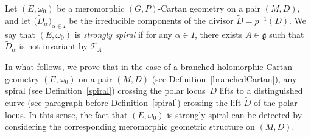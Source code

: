 \documentclass[10pt,a4paper]{amsart}
\numberwithin{equation}{section}
\begin{document}
 \begin{Definition}\label{strongtaucondition} Let $(E,\omega_0)$ be a meromorphic $(G,P)$-Cartan geometry on a pair $(M,D)$, and let $\big(\tilde{D}_\alpha\big)_{\alpha\in I}$ be the irreducible components of the divisor $\tilde{D}=p^{-1}(D)$. We say that $(E,\omega_0)$ is \textit{strongly spiral} if for any $\alpha \in I$, there exists $A\in \mathfrak{g}$ such that $\tilde{D}_\alpha$ is not invariant by $\mathcal{T}_A$.
 \end{Definition}

In what follows, we prove that in the case of a branched holomorphic Cartan geometry $(E,\omega_0)$ on a pair $(M,D)$ (see Definition~\ref{branchedCartan}), any spiral (see Definition~\ref{spiral}) crossing the polar locus~$D$ lifts to a distinguished curve (see paragraph before Definition~\ref{spiral}) crossing the lift $\tilde{D}$ of the polar locus. In this sense, the fact that $(E,\omega_0)$ is strongly spiral can be detected by considering the corresponding meromorphic geometric structure on $(M,D)$.
\end{document}
